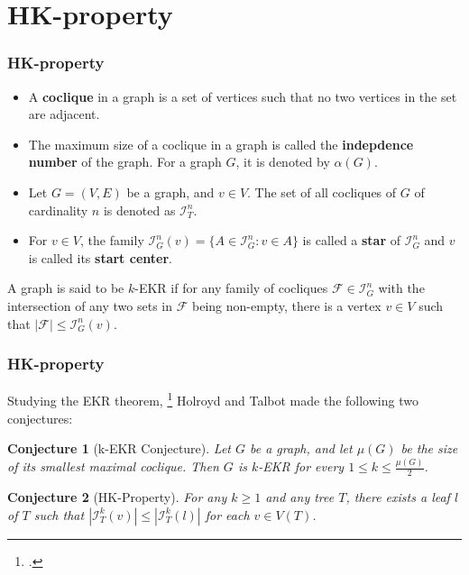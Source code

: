 \documentclass[10pt,]{beamer}
\theoremstyle{conjectureStyle}
\newtheorem*{conjecture}{Conjecture}
\theoremstyle{notationStyle}
\begin{document}
\section{HK-property}
\begin{frame}\frametitle{HK-property}
    \begin{definition}[Cocliques]
        \begin{itemize}
            \item A \textbf{coclique} in a graph is a set of vertices such that no two vertices in the set are adjacent.
            \item The maximum size of a coclique in a graph is called the \textbf{indepdence number} of the graph. For a graph $G$, it is denoted by $\alpha(G)$.
        \end{itemize}
    \end{definition}

    \begin{definition}
        \begin{itemize}
            \item Let $G = (V, E)$ be a graph, and $v \in V$. The set of all cocliques of $G$ of cardinality $n$ is denoted as $\mathcal{I}^n_T$.
            \item For $v \in V$, the family $\mathcal{I}^n_G(v) = \{A \in \mathcal{I}^n_G : v \in A\}$ is called a \textbf{star} of $\mathcal{I}^n_G$ and $v$ is called its \textbf{start center}.
        \end{itemize}
    \end{definition}

    \begin{definition}
        A graph is said to be $k$-EKR if for any family of cocliques $\mathcal{F} \in \mathcal{I}^n_G$ with the intersection of any two sets in $\mathcal{F}$ being non-empty, there is a vertex $v \in V$ such that $|\mathcal{F}| \leq \mathcal{I}^n_G(v)$.
    \end{definition}
\end{frame}

\begin{frame}\frametitle{HK-property}
    Studying the EKR theorem, \footcite{HOLROYD2005165} Holroyd and Talbot made the following two conjectures:
    \begin{conjecture}[k-EKR Conjecture]
        Let $G$ be a graph, and let $\mu(G)$ be the size of its smallest maximal coclique. Then $G$ is $k$-EKR for every $1 \leq k \leq \frac{\mu(G)}{2}$.
    \end{conjecture}
    \begin{conjecture}[HK-Property]
        For any $k \geq 1$ and any tree $T$, there exists a leaf $l$ of $T$ such that $|\mathcal{I}^k_T(v)| \leq |\mathcal{I}^k_T(l)|$ for each $v \in V(T)$.
    \end{conjecture}
\end{frame}
\end{document}
